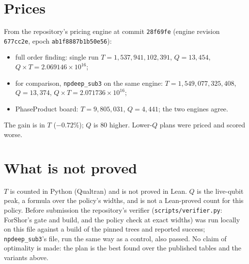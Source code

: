 \documentclass[11pt]{article}
\begin{document}
\section*{Prices}
From the repository's pricing engine at commit \texttt{28f69fe} (engine revision \texttt{677cc2e}, epoch
\texttt{ab1f8887b1b50e56}):
\begin{itemize}
\item full order finding: single run $T = 1{,}537{,}941{,}102{,}391$, $Q = 13{,}454$,
$Q \times T = 2.069146 \times 10^{16}$;
\item for comparison, \texttt{npdeep\_sub3} on the same engine: $T = 1{,}549{,}077{,}325{,}408$, $Q = 13{,}374$,
$Q \times T = 2.071736 \times 10^{16}$;
\item PhaseProduct board: $T = 9{,}805{,}031$, $Q = 4{,}441$; the two engines agree.
\end{itemize}
The gain is in $T$ ($-0.72\%$); $Q$ is $80$ higher. Lower-$Q$ plans were priced and scored worse.

\section*{What is not proved}
$T$ is counted in Python (Qualtran) and is not proved in Lean. $Q$ is the live-qubit peak, a formula over the
policy's widths, and is not a Lean-proved count for this policy. Before submission the repository's verifier
(\texttt{scripts/verifier.py}: ForShor's gate and build, and the policy check at exact widths) was run locally
on this file against a build of the pinned trees and reported success; \texttt{npdeep\_sub3}'s file, run the
same way as a control, also passed. No claim of optimality is made: the plan is the best found over the
published tables and the variants above.
\end{document}
